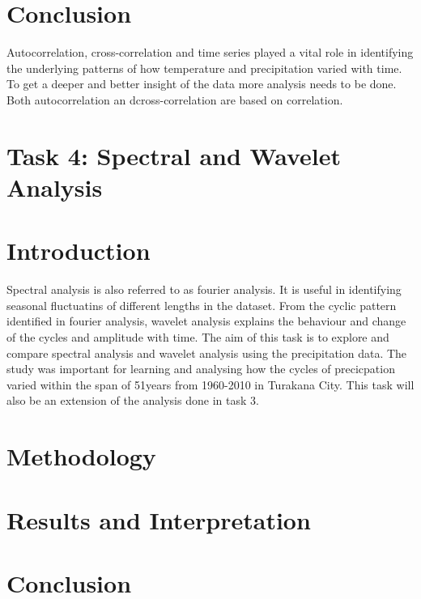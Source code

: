 \documentclass[12pt,a4paper]{article}
\begin{document}
\newpage
\section{Conclusion}
Autocorrelation, cross-correlation and time series played a vital role in identifying the underlying patterns of how temperature and precipitation varied with time. To get a deeper and better insight of the data more analysis needs to be done. Both autocorrelation an dcross-correlation are based on correlation.















\section{Task 4: Spectral and Wavelet Analysis}
\section{Introduction}
Spectral analysis is also referred to as fourier analysis. It is useful in identifying seasonal fluctuatins of different lengths in the dataset. From the cyclic pattern identified in fourier analysis, wavelet analysis explains the behaviour and change of the cycles and amplitude with time. The aim of this task is to explore and compare spectral analysis and wavelet analysis using the precipitation data. The study was important for learning and analysing how the cycles of precicpation varied within the span of 51years from  1960-2010 in Turakana City. This task will also be an extension of the analysis done in task 3.
\section{Methodology}


\section{Results and Interpretation}
\section{Conclusion}
\end{document}
